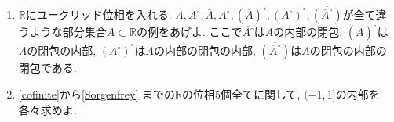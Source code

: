 \documentclass[dvipdfmx,a4paper,11pt]{article}
\newcommand{\R}{\mathbb{R}}
\theoremstyle{definition}
\begin{document}
\begin{enumerate}[label=\textbf{問}\ref*{sec-subspace}.\arabic*]
 
 




	



	




\item $\R$にユークリッド位相を入れる. $A,A^{\circ},\overline{A}, \overline{A^\circ}, {(\overline{A})}^\circ, {\overline{(A^\circ)}}^\circ, \overline{({\overline{A}}^\circ)}$が全て違うような部分集合$A \subset \R$の例をあげよ.
ここで$\overline{A^\circ}$は$A$の内部の閉包, 
${(\overline{A})}^\circ$は$A$の閉包の内部, ${\overline{(A^\circ)}}^\circ$は$A$の内部の閉包の内部, $\overline{({\overline{A}}^\circ)}$は$A$の閉包の内部の閉包である.




\item \ref{cofinite}から\ref{Sorgenfrey} までの$\R$の位相5個全てに関して, $(-1,1]$の内部を各々求めよ.


\end{enumerate}
\end{document}
